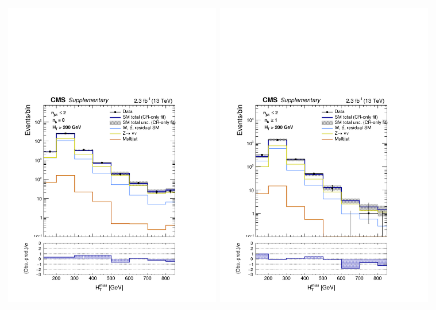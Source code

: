 \clearpage
\begin{figure}[!h]
  \begin{center}
    \includegraphics[width=0.49\textwidth]{Supplementary/aggregated_mhtShape_eq0b_le2j_200_Inf_crfit_aux.pdf} 
    \includegraphics[width=0.49\textwidth]{Supplementary/aggregated_mhtShape_ge1b_le2j_200_Inf_crfit_aux.pdf} \\
    \caption{
      \label{fig:aggr_monojet} 
    }
  \end{center}
\end{figure}

